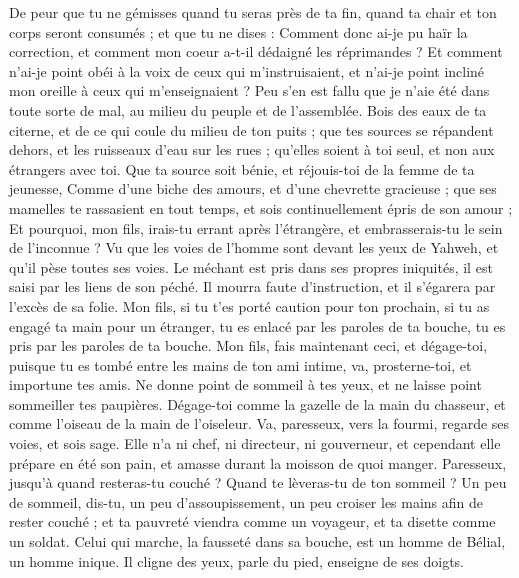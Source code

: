\begin{multicols}{2}
De peur que tu ne gémisses quand tu seras près de ta fin, quand ta chair et ton corps seront consumés ;
et que tu ne dises : Comment donc ai-je pu haïr la correction, et comment mon coeur a-t-il dédaigné les réprimandes ?
Et comment n'ai-je point obéi à la voix de ceux qui m'instruisaient, et n'ai-je point incliné mon oreille à ceux qui m'enseignaient ?
Peu s'en est fallu que je n'aie été dans toute sorte de mal, au milieu du peuple et de l'assemblée.
Bois des eaux de ta citerne, et de ce qui coule du milieu de ton puits ;
que tes sources se répandent dehors, et les ruisseaux d'eau sur les rues ;
qu'elles soient à toi seul, et non aux étrangers avec toi.
Que ta source soit bénie, et réjouis-toi de la femme de ta jeunesse,
Comme d'une biche des amours, et d'une chevrette gracieuse ; que ses mamelles te rassasient en tout temps, et sois continuellement épris de son amour ;
Et pourquoi, mon fils, irais-tu errant après l'étrangère, et embrasserais-tu le sein de l'inconnue ?
Vu que les voies de l'homme sont devant les yeux de Yahweh, et qu'il pèse toutes ses voies.
Le méchant est pris dans ses propres iniquités, il est saisi par les liens de son péché.
Il mourra faute d'instruction, et il s'égarera par l'excès de sa folie.
\VerseOne{}Mon fils, si tu t'es porté caution pour ton prochain, si tu as engagé ta main pour un étranger,
tu es enlacé par les paroles de ta bouche, tu es pris par les paroles de ta bouche.
Mon fils, fais maintenant ceci, et dégage-toi, puisque tu es tombé entre les mains de ton ami intime, va, prosterne-toi, et importune tes amis.
Ne donne point de sommeil à tes yeux, et ne laisse point sommeiller tes paupières.
Dégage-toi comme la gazelle de la main du chasseur, et comme l'oiseau de la main de l'oiseleur.
Va, paresseux, vers la fourmi, regarde ses voies, et sois sage.
Elle n'a ni chef, ni directeur, ni gouverneur,
et cependant elle prépare en été son pain, et amasse durant la moisson de quoi manger.
Paresseux, jusqu'à quand resteras-tu couché ? Quand te lèveras-tu de ton sommeil ?
Un peu de sommeil, dis-tu, un peu d'assoupissement, un peu croiser les mains afin de rester couché ;
et ta pauvreté viendra comme un voyageur, et ta disette comme un soldat.
Celui qui marche, la fausseté dans sa bouche, est un homme de Bélial, un homme inique.
Il cligne des yeux, parle du pied, enseigne de ses doigts.

\end{multicols}
